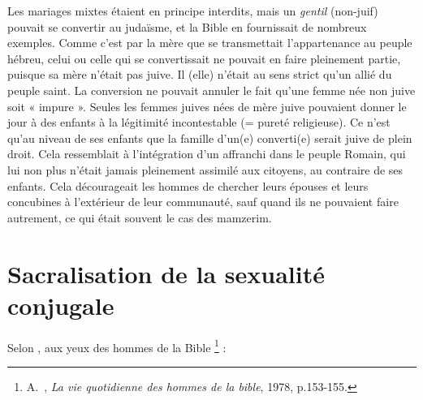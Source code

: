 Les mariages mixtes étaient en principe interdits, mais un \emph{gentil} (non-juif) pouvait se convertir au judaïsme, et la Bible en fournissait de nombreux exemples. Comme c'est par la mère que se transmettait l'appartenance au peuple hébreu, celui ou celle qui se convertissait ne pouvait en faire pleinement partie, puisque sa mère n'était pas juive. Il (elle) n'était au sens strict qu'un allié du peuple saint. La conversion ne pouvait annuler le fait qu'une femme née non juive soit « impure ». Seules les femmes juives nées de mère juive pouvaient donner le jour à des enfants à la légitimité incontestable (= pureté religieuse). Ce n'est qu'au niveau de ses enfants que la famille d'un(e) converti(e) serait juive de plein droit. Cela ressemblait à l'intégration d'un affranchi dans le peuple Romain, qui lui non plus n'était jamais pleinement assimilé aux citoyens, au contraire de ses enfants. Cela décourageait les hommes de chercher leurs épouses et leurs concubines à l'extérieur de leur communauté, sauf quand ils ne pouvaient faire autrement, ce qui était souvent le cas des mamzerim.



\section{Sacralisation de la sexualité conjugale}

 


Selon , aux yeux des hommes
 de la Bible%
\footnote{A.~, \emph{La vie quotidienne des hommes de la bible}, 1978, p.153-155.}%
 :

